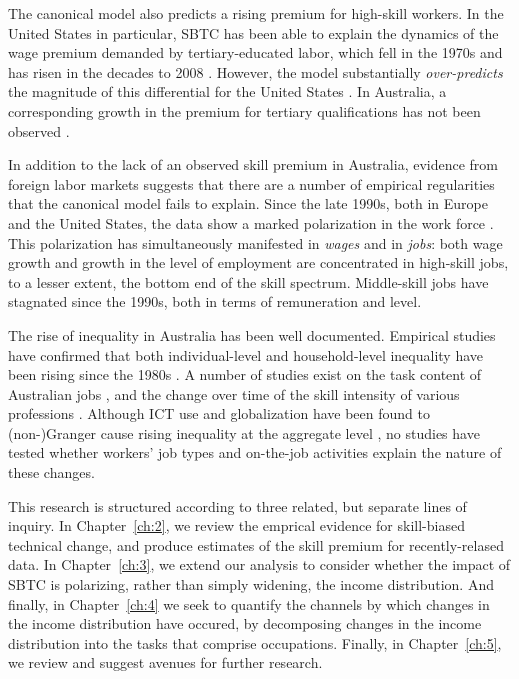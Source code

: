 The canonical model also predicts a rising premium for high-skill workers. In the United States in particular, SBTC has been able to explain the dynamics of the wage premium demanded by tertiary-educated labor, which fell in the 1970s and has risen in the decades to 2008 \citep{Acemoglu2011}. However, the model substantially \emph{over-predicts} the magnitude of this differential for the United States \citep{Autor2008}. In Australia, a corresponding growth in the premium for tertiary qualifications has not been observed \citep{Coelli2009}.

In addition to the lack of an observed skill premium in Australia, evidence from foreign labor markets suggests that there are a number of empirical regularities that the canonical model fails to explain. Since the late 1990s, both in Europe and the United States, the data show a marked polarization in the work force \citep{Goos2007, Autor2006}. This polarization has simultaneously manifested in \emph{wages} and in \emph{jobs}: both wage growth and growth in the level of employment are concentrated in high-skill jobs, to a lesser extent, the bottom end of the skill spectrum. Middle-skill jobs have stagnated since the 1990s, both in terms of remuneration and level.

The rise of inequality in Australia has been well documented. Empirical studies have confirmed that both individual-level and household-level inequality have been rising since the 1980s \citep{Borland1999,Leigh2005,Leigh2013,Gaston2009}. A number of studies exist on the task content of Australian jobs \citep{Esposto2012a}, and the change over time of the skill intensity of various professions \citep{Esposto2012, Esposto2012a}. Although ICT use and globalization have been found to (non-)Granger cause rising inequality at the aggregate level \citep{Gaston2009}, no studies have tested whether workers' job types and on-the-job activities explain the nature of these changes.

This research is structured according to three related, but separate lines of inquiry. In Chapter~\ref{ch:2}, we review the emprical evidence for skill-biased technical change, and produce estimates of the skill premium for recently-relased data. In Chapter~\ref{ch:3}, we extend our analysis to consider whether the impact of SBTC is polarizing, rather than simply widening, the income distribution. And finally, in Chapter~\ref{ch:4} we seek to quantify the channels by which changes in the income distribution have occured, by  decomposing changes in the income distribution into the tasks that comprise occupations. Finally, in Chapter~\ref{ch:5}, we review and suggest avenues for further research.

